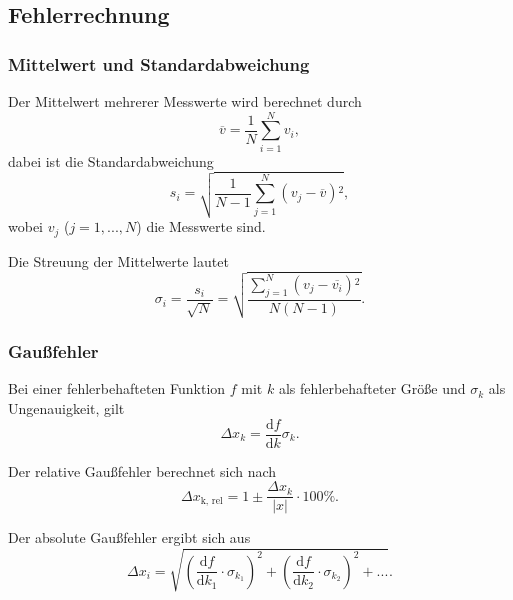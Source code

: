 \subsection{Fehlerrechnung}
\subsubsection{Mittelwert und Standardabweichung}
Der Mittelwert mehrerer Messwerte wird berechnet durch
\begin{equation}
\overline{v} = \frac{1}{N} \sum_{i=1}^N v_i,
\end{equation}
dabei ist die Standardabweichung
\begin{equation}
s_i = \sqrt{\frac{1}{N - 1} \sum_{j=1}^N \left(v_j - \overline{v}\right){^2}},
\end{equation}
wobei $v_j$ ($j = 1, ..., N$) die Messwerte sind.

Die Streuung der Mittelwerte lautet
\begin{equation}
\sigma_i = \frac{s_i}{\sqrt{N}} = \sqrt{\frac{\sum_{j=1}^N \left(v_j - \overline{v_i}\right){^2}}{N \left(N - 1 \right)}}.
\end{equation}

\subsubsection{Gaußfehler}
Bei einer fehlerbehafteten Funktion $f$ mit $k$ als fehlerbehafteter Größe und $\sigma_k$ als Ungenauigkeit, gilt
\begin{equation}
\Delta x_k = \frac{\mathrm{d}f}{\mathrm{d}k}\sigma_k.
\end{equation}

Der relative Gaußfehler berechnet sich nach
\begin{equation}
\Delta x_\text{k, rel} = 1 \pm \frac{\Delta x_k}{|x|}\cdot 100\%.
\end{equation}

Der absolute Gaußfehler ergibt sich aus
\begin{equation}
\Delta x_i = \sqrt{\left(\frac{\mathrm{d}f}{\mathrm{d}k_{1}}\cdot \sigma_{k_{1}}\right)^2 + \left(\frac{\mathrm{d}f}{\mathrm{d}k_{2}}\cdot \sigma_{k_{2}}\right)^2 + ...}.
\end{equation}


